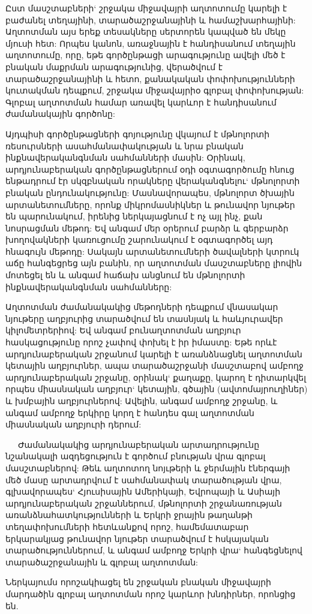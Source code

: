 \documentclass[12pt]{article}
\begin{document}
\begin{sloppypar}
Ըստ մասշտաբների` շրջակա միջավայրի աղտոտումը կարելի է բաժանել տեղայինի, տարածաշրջանայինի և համաշխարհայինի: Աղտոտման այս երեք տեսակները սերտորեն կապված են մեկը մյուսի հետ: Որպես կանոն, առաջնային է հանդիսանում տեղային աղտոտումը, որը, եթե գործընթացի արագությունը ավելի մեծ է բնական մաքրման արագությունից, վերածվում է տարածաշրջանայինի և հետո, քանակական փոփոխությունների կուտակման դեպքում, շրջակա միջավայրիօ գլոբալ փոփոխության: Գլոբալ աղտոտման համար առավել կարևոր է հանդիսանում ժամանակային գործոնը:

Այդպիսի գործընթացների գոյությունը վկայում է մթնոլորտի ռեսուրսների ասահմանափակության և նրա բնական ինքնավերականգնման սահմանների մասին: Օրինակ, արդյունաբերական գործընթացներում օդի օգտագործումը հնուց ենթադրում էր սկզբնական որակները վերականգնելու` մթնոլորտի բնական ընդունակությունը: Մասնավորապես, մթնոլորտ ծխային արտանետումները, որոնք միկրոմասնիկներ և թունավոր նյութեր են պարունակում, իրենից ներկայացնում է ոչ այլ ինչ, քան նոսրացման մեթոդ: Եվ անգամ մեր օրերում բարձր և գերբարձր խողովակների կառուցումը շարունակում է օգտագործել այդ հնագույն մեթոդը: Սակայն արտանետումների ծավալների կտրուկ աճը հանգեցրեց այն բանին, որ աղտոտման մասշտաբները լիովին մոտեցել են և անգամ հաճախ անցնում են մթնոլորտի ինքնավերականգնման սահմանները:

Աղտոտման ժամանակակից մեթոդների դեպքում վնասակար նյութերը աղբյուրից տարածվում են տասնյակ և հաևյուրավեր կիլոմետրերիով: Եվ անգամ բունաղտոտման աղբյուր հասկացությունը որոշ չափով փոխել է իր իմաստը: Եթե որևէ արդյունաբերական շրջանում կարելի է առանձնացնել աղտոտման կետային աղբյուրներ, ապա տարածաշրջանի մասշտաբով ամբողջ արդյունաբերական շրջանը, օրինակ` քաղաքը, կարող է դիտարկվել որպես միասնական աղբյուր` կետային, գծային (ավտոմայրուղիներ) և խմբային աղբյուրներով: Ավելին, անգամ ամբողջ շրջանը, և անգամ ամբողջ երկիրը կորղ է հանդես գալ աղտոտման միասնական աղբյուրի դերում:

   Ժամանակակից արդյունաբերական արտադրությունը նշանակալի ազդեցություն է գործում բնության վրա գլոբալ մասշտաբներով: Թեև աղտոտող նոյւթերի և ջերմային էներգայի մեծ մասը արտադրվում է սահմանափակ տարածության վրա, գլխավորապես` Հյուսիսային Ամերիկայի, Եվրոպայի և Ասիայի արդյունաբերական շրջաններում, մթնոլորտի շրջանառության առանձնահատկությունների և Երկրի ջրային թաղանթի տեղափոխումների հետևանքով որոշ, համեմատաբար երկարակյաց թունավոր նյութեր տարածվում է հսկայական տարածություններում, և անգամ ամբողջ Երկրի վրա` հանգեցնելով տարածաշրջանային և գլոբալ աղտոտման:

Ներկայումս որոշակիացել են շրջական բնական միջավայրի մարդածին գլոբալ աղտոտման որոշ կարևոր խնդիրներ, որոնցից են.


\end{sloppypar}
\end{document}
